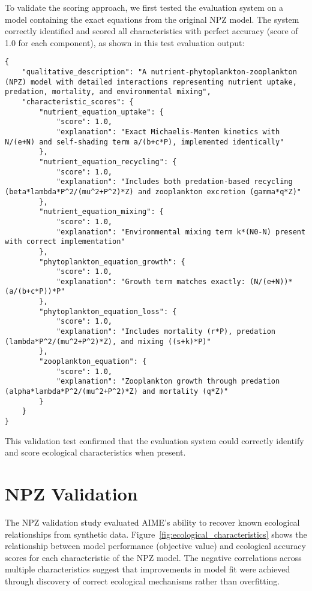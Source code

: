 To validate the scoring approach, we first tested the evaluation system on a model containing the exact equations from the original NPZ model. The system correctly identified and scored all characteristics with perfect accuracy (score of 1.0 for each component), as shown in this test evaluation output:

\begin{lstlisting}
{
    "qualitative_description": "A nutrient-phytoplankton-zooplankton (NPZ) model with detailed interactions representing nutrient uptake, predation, mortality, and environmental mixing",
    "characteristic_scores": {
        "nutrient_equation_uptake": {
            "score": 1.0,
            "explanation": "Exact Michaelis-Menten kinetics with N/(e+N) and self-shading term a/(b+c*P), implemented identically"
        },
        "nutrient_equation_recycling": {
            "score": 1.0,
            "explanation": "Includes both predation-based recycling (beta*lambda*P^2/(mu^2+P^2)*Z) and zooplankton excretion (gamma*q*Z)"
        },
        "nutrient_equation_mixing": {
            "score": 1.0,
            "explanation": "Environmental mixing term k*(N0-N) present with correct implementation"
        },
        "phytoplankton_equation_growth": {
            "score": 1.0,
            "explanation": "Growth term matches exactly: (N/(e+N))*(a/(b+c*P))*P"
        },
        "phytoplankton_equation_loss": {
            "score": 1.0,
            "explanation": "Includes mortality (r*P), predation (lambda*P^2/(mu^2+P^2)*Z), and mixing ((s+k)*P)"
        },
        "zooplankton_equation": {
            "score": 1.0,
            "explanation": "Zooplankton growth through predation (alpha*lambda*P^2/(mu^2+P^2)*Z) and mortality (q*Z)"
        }
    }
}
\end{lstlisting}

This validation test confirmed that the evaluation system could correctly identify and score ecological characteristics when present.

\section{NPZ Validation}
\label{sec:npz_validation}

The NPZ validation study evaluated AIME's ability to recover known ecological relationships from synthetic data. Figure~\ref{fig:ecological_characteristics} shows the relationship between model performance (objective value) and ecological accuracy scores for each characteristic of the NPZ model. The negative correlations across multiple characteristics suggest that improvements in model fit were achieved through discovery of correct ecological mechanisms rather than overfitting.

